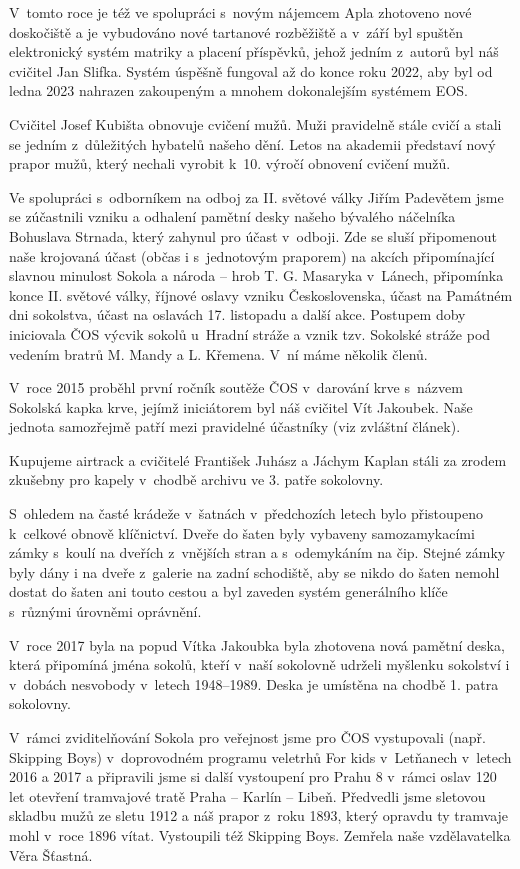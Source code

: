\documentclass[a5paper, 12pt, twoside]{article}
\begin{document}
V~tomto roce je též ve spolupráci s~novým nájemcem Apla zhotoveno nové
doskočiště a je vybudováno nové tartanové rozběžiště a v~září byl
spuštěn elektronický systém matriky a placení příspěvků, jehož jedním
z~autorů byl náš cvičitel Jan Slifka. Systém úspěšně fungoval až do konce
roku 2022, aby byl od ledna 2023 nahrazen zakoupeným a mnohem
dokonalejším systémem EOS.

Cvičitel Josef Kubišta obnovuje cvičení mužů. Muži pravidelně stále
cvičí a stali se jedním z~důležitých hybatelů našeho dění. Letos na
akademii představí nový prapor mužů, který nechali vyrobit k~10. výročí
obnovení cvičení mužů.

Ve spolupráci s~odborníkem na odboj za II. světové války Jiřím Padevětem
jsme se zúčastnili vzniku a odhalení pamětní desky našeho bývalého
náčelníka Bohuslava Strnada, který zahynul pro účast v~odboji. Zde se
sluší připomenout naše krojovaná účast (občas i s~jednotovým praporem)
na akcích připomínající slavnou minulost Sokola a národa -- hrob T. G.
Masaryka v~Lánech, připomínka konce II. světové války, říjnové oslavy
vzniku Československa, účast na Památném dni sokolstva, účast na
oslavách 17. listopadu a další akce. Postupem doby iniciovala ČOS výcvik
sokolů u~Hradní stráže a vznik tzv. Sokolské stráže pod vedením bratrů
M. Mandy a L. Křemena. V~ní máme několik členů.

V~roce 2015 proběhl první ročník soutěže ČOS v~darování krve s~názvem
Sokolská kapka krve, jejímž iniciátorem byl náš cvičitel Vít Jakoubek.
Naše jednota samozřejmě patří mezi pravidelné účastníky (viz zvláštní
článek).

Kupujeme airtrack a cvičitelé František Juhász a Jáchym Kaplan stáli za
zrodem zkušebny pro kapely v~chodbě archivu ve 3. patře sokolovny.

S~ohledem na časté krádeže v~šatnách v~předchozích letech bylo
přistoupeno k~celkové obnově klíčnictví. Dveře do šaten byly vybaveny
samozamykacími zámky s~koulí na dveřích z~vnějších stran a s~odemykáním
na čip. Stejné zámky byly dány i na dveře z~galerie na zadní schodiště,
aby se nikdo do šaten nemohl dostat do šaten ani touto cestou a byl
zaveden systém generálního klíče s~různými úrovněmi oprávnění.

V~roce 2017 byla na popud Vítka Jakoubka byla zhotovena nová pamětní
deska, která připomíná jména sokolů, kteří v~naší sokolovně udrželi
myšlenku sokolství i v~dobách nesvobody v~letech 1948--1989.
Deska je umístěna na chodbě 1. patra sokolovny.

V~rámci zviditelňování Sokola pro veřejnost jsme pro ČOS vystupovali
(např. Skipping Boys) v~doprovodném programu veletrhů For kids
v~Letňanech v~letech 2016 a 2017 a připravili jsme si další vystoupení pro
Prahu 8 v~rámci oslav 120 let otevření tramvajové tratě Praha -- Karlín
-- Libeň. Předvedli jsme sletovou skladbu mužů ze sletu 1912 a náš
prapor z~roku 1893, který opravdu ty tramvaje mohl v~roce 1896 vítat.
Vystoupili též Skipping Boys. Zemřela naše vzdělavatelka Věra Šťastná.
\end{document}
